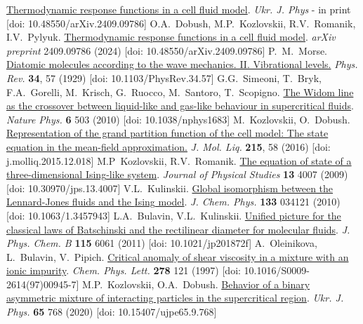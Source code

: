 \begin{thebibliography}{99}
	\href{https://doi.org/10.48550/arXiv.2409.09786}{Thermodynamic response functions in a cell fluid model}. \textit{Ukr. J. Phys} - in print [doi: 10.48550/arXiv.2409.09786]
	 O.A.~Dobush, M.P.~Kozlovskii, R.V.~Romanik, I.V.~Pylyuk.
	\href{https://doi.org/10.48550/arXiv.2409.09786}{Thermodynamic response functions in a cell fluid model}. \textit{arXiv preprint} 2409.09786 (2024) [doi: 10.48550/arXiv.2409.09786]
	 P.~M.~Morse. 
	\href{https://link.aps.org/doi/10.1103/PhysRev.34.57}{Diatomic molecules according to the wave mechanics. II. Vibrational levels.} \textit{Phys. Rev.} \textbf{34}, 57 (1929) [doi: 10.1103/PhysRev.34.57]
	 G.G.~Simeoni, T.~Bryk, F.A.~Gorelli, M.~Krisch, G.~Ruocco, M.~Santoro, T.~Scopigno.
	\href{https://doi.org/10.1038/nphys1683}{ The Widom line as the crossover between liquid-like and gas-like behaviour in supercritical fluids}. \textit{Nature Phys.} \textbf{6} 503 (2010) [doi: 10.1038/nphys1683]
	 M.~Kozlovskii, O.~Dobush.
	\href{https://doi.org/j.molliq.2015.12.018}{Representation of the grand partition function of the cell model: The state equation in the mean-field approximation.} \textit{J. Mol. Liq.} \textbf{215}, 58 (2016) [doi: j.molliq.2015.12.018]
	 M.P~Kozlovskii, R.V.~Romanik.
	\href{https://doi.org/10.30970/jps.13.4007}{The equation of state of a three-dimensional {Ising}-like system}. \textit{Journal of Physical Studies} \textbf{13} 4007 (2009) [doi: 10.30970/jps.13.4007]
	 V.L.~Kulinskii.
	\href{https://doi.org/10.1063/1.3457943}{Global isomorphism between the {Lennard-Jones} fluids and the {Ising} model}. \textit{J. Chem. Phys.} \textbf{133} 034121 (2010) [doi: 10.1063/1.3457943]
	 L.A.~Bulavin, V.L.~Kulinskii.
	\href{https://doi.org/10.1021/jp201872f}{Unified picture for the classical laws of {B}atschinski and the rectilinear diameter for molecular fluids}. \textit{J. Phys. Chem. B} \textbf{115} 6061 (2011) [doi: 10.1021/jp201872f]
	 A.~Oleinikova, L.~Bulavin, V.~Pipich.
	\href{https://doi.org/10.1016/S0009-2614(97)00945-7}{Critical anomaly of shear viscosity in a mixture with an ionic impurity}. \textit{Chem. Phys. Lett.} \textbf{278} 121 (1997) [doi: 10.1016/S0009-2614(97)00945-7]
	 M.P.~Kozlovskii, O.A.~Dobush.
	\href{https://doi.org/10.15407/ujpe65.9.768}{Behavior of a binary asymmetric mixture of interacting particles in the supercritical region}. \textit{Ukr. J. Phys.} \textbf{65} 768 (2020) [doi: 10.15407/ujpe65.9.768]
	
\end{thebibliography}